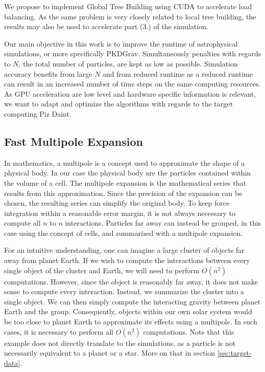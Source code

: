\documentclass[]{article}
\begin{document}
We propose to implement Global Tree Building using CUDA to accelerate load balancing. As the same problem is very closely related to local tree building, the results may also be used to accelerate part (3.) of the simulation. 

Our main objective in this work is to improve the runtime of astrophysical simulations, or more specifically PKDGrav. Simultaneously penalties with regards to $N$, the total number of particles, are kept as low as possible. Simulation accuracy benefits from large $N$ and from reduced runtime as a reduced runtime can result in an increased number of time steps on the same computing resources. As GPU acceleration are low level and hardware specific information is relevant, we want to adapt and optimize the algorithms with regards to the target computing Piz Daint.


\subsection{Fast Multipole Expansion} \label{sec:multipole}

In mathematics, a multipole is a concept used to approximate the shape of a physical body. In our case the physical body are the particles contained within the volume of a cell. The multipole expansion is the mathematical series that results from this approximation. Since the precision of the expansion can be chosen, the resulting series can simplify the original body. 
To keep force integration within a reasonable error margin, it is not always necessary to compute all $n$ to $n$ interactions. Particles far away can instead be grouped, in this case using the concept of cells, and summarized with a multipole expansion.

For an intuitive understanding, one can imagine a large cluster of objects far away from planet Earth. If we wish to compute the interactions between every single object of the cluster and Earth, we will need to perform $O(n^2)$ computations. However, since the object is reasonably far away, it does not make sense to compute every interaction. Instead, we summarize the cluster into a single object. We can then simply compute the interacting gravity between planet Earth and the group. Consequently, objects within our own solar system would be too close to planet Earth to approximate its effects using a multipole. In such cases, it is necessary to perform all $O(n^2)$ computations.
Note that this example does not directly translate to the simulations, as a particle is not necessarily equivalent to a planet or a star. More on that in section \ref{sec:target-data}.
\end{document}
